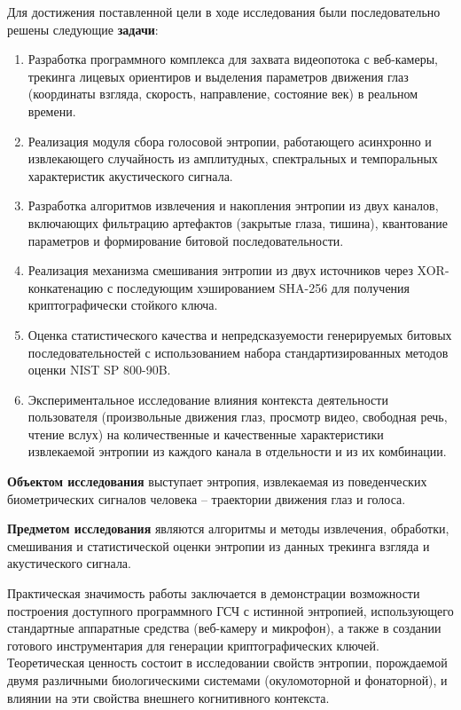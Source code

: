\documentclass[14pt, a4paper]{extreport}
\begin{document}
Для достижения поставленной цели в ходе исследования были последовательно решены следующие \textbf{задачи}:
\begin{enumerate}
\item Разработка программного комплекса для захвата видеопотока с веб-камеры, трекинга лицевых ориентиров и выделения параметров движения глаз (координаты взгляда, скорость, направление, состояние век) в реальном времени.
\item Реализация модуля сбора голосовой энтропии, работающего асинхронно и извлекающего случайность из амплитудных, спектральных и темпоральных характеристик акустического сигнала.
\item Разработка алгоритмов извлечения и накопления энтропии из двух каналов, включающих фильтрацию артефактов (закрытые глаза, тишина), квантование параметров и формирование битовой последовательности.
\item Реализация механизма смешивания энтропии из двух источников через XOR-конкатенацию с последующим хэшированием SHA-256 для получения криптографически стойкого ключа.
\item Оценка статистического качества и непредсказуемости генерируемых битовых последовательностей с использованием набора стандартизированных методов оценки NIST SP 800-90B.
\item Экспериментальное исследование влияния контекста деятельности пользователя (произвольные движения глаз, просмотр видео, свободная речь, чтение вслух) на количественные и качественные характеристики извлекаемой энтропии из каждого канала в отдельности и из их комбинации.
\end{enumerate}

\textbf{Объектом исследования} выступает энтропия, извлекаемая из поведенческих биометрических сигналов человека -- траектории движения глаз и голоса.

\textbf{Предметом исследования} являются алгоритмы и методы извлечения, обработки, смешивания и статистической оценки энтропии из данных трекинга взгляда и акустического сигнала.

Практическая значимость работы заключается в демонстрации возможности построения доступного программного ГСЧ с истинной энтропией, использующего стандартные аппаратные средства (веб-камеру и микрофон), а также в создании готового инструментария для генерации криптографических ключей. Теоретическая ценность состоит в исследовании свойств энтропии, порождаемой двумя различными биологическими системами (окуломоторной и фонаторной), и влиянии на эти свойства внешнего когнитивного контекста.
\end{document}
